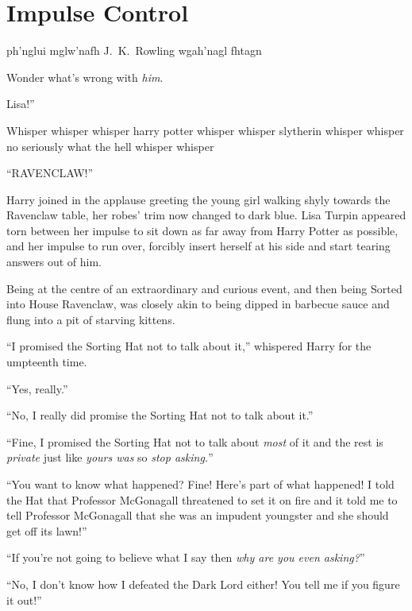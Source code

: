 \chapter{Impulse Control}

\begin{chapterOpeningAuthorNote}
ph'nglui mglw'nafh J.~K.~Rowling wgah'nagl fhtagn
\end{chapterOpeningAuthorNote}
\begin{chapterOpeningQuote}
Wonder what’s wrong with \emph{him}.
\end{chapterOpeningQuote}

 Lisa!”

\hplettrineextrapara
Whisper whisper whisper harry potter whisper whisper slytherin whisper whisper no seriously what the hell whisper whisper

“RAVENCLAW!”

Harry joined in the applause greeting the young girl walking shyly towards the Ravenclaw table, her robes’ trim now changed to dark blue. Lisa Turpin appeared torn between her impulse to sit down as far away from Harry Potter as possible, and her impulse to run over, forcibly insert herself at his side and start tearing answers out of him.

Being at the centre of an extraordinary and curious event, and then being Sorted into House Ravenclaw, was closely akin to being dipped in barbecue sauce and flung into a pit of starving kittens.

“I promised the Sorting Hat not to talk about it,” whispered Harry for the umpteenth time.

“Yes, really.”

“No, I really did promise the Sorting Hat not to talk about it.”

“Fine, I promised the Sorting Hat not to talk about \emph{most} of it and the rest is \emph{private} just like \emph{yours was} so \emph{stop asking.}”

“You want to know what happened? Fine! Here’s part of what happened! I told the Hat that Professor McGonagall threatened to set it on fire and it told me to tell Professor McGonagall that she was an impudent youngster and she should get off its lawn!”

“If you’re not going to believe what I say then \emph{why are you even asking?}”

“No, I don’t know how I defeated the Dark Lord either! You tell me if you figure it out!”

